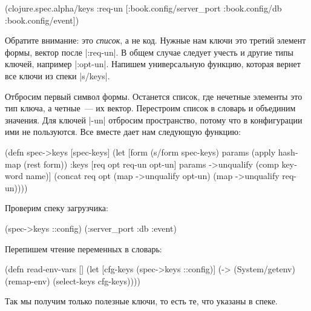 \begin{english}
  \begin{clojure}
(clojure.spec.alpha/keys
 :req-un [:book.config/server_port
          :book.config/db
          :book.config/event])
  \end{clojure}
\end{english}

Обратите внимание: это \emph{список}, а не код. Нужные нам ключи это третий
элемент формы, вектор после \spverb|:req-un|. В общем случае следует учесть и
другие типы ключей, например \spverb|:opt-un|. Напишем универсальную функцию,
которая вернет все ключи из спеки \spverb|s/keys|.

Отбросим первый символ формы. Останется список, где нечетные элементы это тип
ключа, а четные~--- их вектор. Перестроим список в словарь и объединим
значения. Для ключей \spverb|-un| отбросим пространство, потому что в
конфигурации ими не пользуются. Все вместе дает нам следующую функцию:

\begin{english}
  \begin{clojure}
(defn spec->keys
  [spec-keys]
  (let [form (s/form spec-keys)
        params (apply hash-map (rest form))
        {:keys [req opt req-un opt-un]} params
        ->unqualify (comp keyword name)]
    (concat req
            opt
            (map ->unqualify opt-un)
            (map ->unqualify req-un))))
  \end{clojure}
\end{english}

\noindent
Проверим спеку загрузчика:

\begin{english}
  \begin{clojure}
(spec->keys ::config)
(:server_port :db :event)
  \end{clojure}
\end{english}

\noindent
Перепишем чтение переменных в словарь:

\begin{english}
  \begin{clojure}
(defn read-env-vars []
  (let [cfg-keys (spec->keys ::config)]
    (-> (System/getenv)
        (remap-env)
        (select-keys cfg-keys))))
  \end{clojure}
\end{english}

\noindent
Так мы получим только полезные ключи, то есть те, что указаны в спеке.

